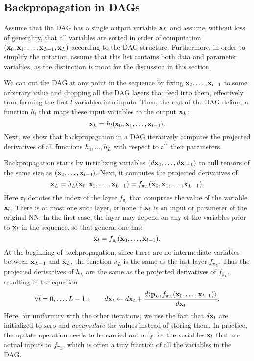 \subsection{Backpropagation in DAGs}\label{s:dag}

Assume that the DAG has a single output variable $\mathbf{x}_L$ and assume, without loss of generality, that all variables are sorted in order of computation $(\mathbf{x}_0,\mathbf{x}_1,\dots,\mathbf{x}_{L-1},\mathbf{x}_L)$ according to the DAG structure. Furthermore, in order to simplify the notation, assume that this list contains both data and parameter variables, as the distinction is moot for the discussion in this section.

We can cut the DAG at any point in the sequence by fixing $\mathbf{x}_0, \dots, \mathbf{x}_{l-1}$ to some arbitrary value and dropping all the DAG layers that feed into them, effectively transforming the first $l$ variables into inputs. Then, the rest of the DAG defines a function $h_l$ that maps these input variables to the output $\mathbf{x}_L$:
\[
 \mathbf{x}_L = h_l(\mathbf{x}_0,\mathbf{x}_1,\dots,\mathbf{x}_{l-1}).
\]
Next, we show that backpropagation in a DAG iteratively computes the projected derivatives of all functions $h_1,\dots,h_L$ with respect to all their parameters.

Backpropagation starts by initializing variables $(d\mathbf{x}_{0},\dots,d\mathbf{x}_{l-1})$ to null tensors of the same size as $(\mathbf{x}_0,\dots,\mathbf{x}_{l-1})$. Next, it computes the projected derivatives of
\[
 \mathbf{x}_L = h_L(\mathbf{x}_0,\mathbf{x}_1,\dots,\mathbf{x}_{L-1}) =
 f_{\pi_L}(\mathbf{x}_0,\mathbf{x}_1,\dots,\mathbf{x}_{L-1}).
\]
Here $\pi_l$ denotes the index of the layer $f_{\pi_l}$ that computes the value of the variable $\mathbf{x}_l$. There is at most one such layer, or none if $\mathbf{x}_l$ is an input or parameter of the original NN. In the first case, the layer may depend on any of the variables prior to $\mathbf{x}_l$ in the sequence, so that general one has:
\[
 \mathbf{x}_{l} = f_{\pi_l}(\mathbf{x}_0,\dots,\mathbf{x}_{l-1}).
\]
	At the beginning of backpropagation, since there are no intermediate variables between $\mathbf{x}_{L-1}$ and $\mathbf{x}_L$, the function $h_L$ is the same as the last layer $f_{\pi_L}$. Thus the projected derivatives of $h_L$ are the same as the projected derivatives of $f_{\pi_L}$, resulting in the equation
\[
\forall t=0,\dots,L-1:\qquad
d\mathbf{x}_{t} \leftarrow d\mathbf{x}_{t}
+ \frac{d\langle \mathbf{p}_L, f_{\pi_L}(\mathbf{x}_0,\dots,\mathbf{x}_{t-1})\rangle}{d\mathbf{x}_t}.
\]
Here, for uniformity with the other iterations, we use the fact that $d\mathbf{x}_l$ are initialized to zero and \emph{accumulate} the values instead of storing them. In practice, the update operation needs to be carried out only for the variables $\mathbf{x}_l$ that are actual inputs to $f_{\pi_L}$, which is often a tiny fraction of all the variables in the DAG.


